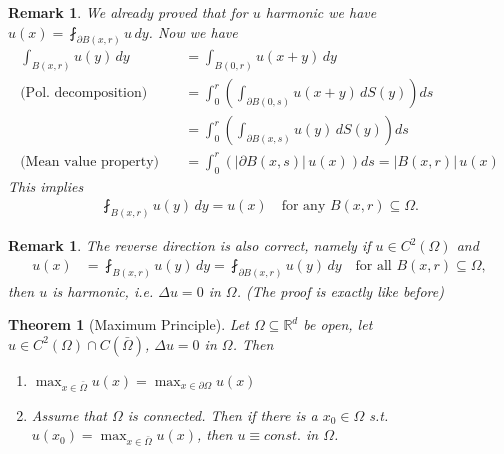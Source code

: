 \documentclass{report}
\theoremstyle{tommy}
\newtheorem{thm}[defn]{Theorem}
\newtheorem{rem}[defn]{Remark}
\begin{document}
  \begin{rem}
    We already proved that for \(u\) harmonic we have \( u(x) = \fint_{\partial B(x,r)} u \, dy \). Now we have 
    \begin{align*}
      \int_{B(x, r)} u(y) \, dy 
      &= \int_{B(0, r)} u(x+y) \, dy \\
      \text{(Pol.\ decomposition)} \quad &= \int_0^r \left(\int_{\partial B(0, s)} u(x+y) \, dS(y)\right) ds \\
      &= \int_0^r \left(\int_{\partial B(x, s)} u(y) \, dS(y) \right) ds \\
      \text{(Mean value property)} \quad &= \int_0^r \left(|\partial B(x, s)| \, u(x) \right) ds
      = |B(x,r)| \, u(x)
    \end{align*}
    This implies
    \begin{align*}
      \fint_{B(x,r)} u(y) \, dy = u(x)
      \quad \text{for any \(B(x,r) \subseteq \Omega\).}
    \end{align*}
  \end{rem}

  \begin{rem}
    The reverse direction is also correct, namely if \(u \in C^2(\Omega)\) and
    \begin{align*}
      u(x) 
      &= \fint_{B(x, r)} u(y) \, dy
      = \fint_{\partial B(x,r)} u(y) \, dy
      \quad \text{for all } B(x,r) \subseteq \Omega,
    \end{align*}
    then \(u\) is harmonic, i.e. \(\Delta u = 0\) in \(\Omega\). (The proof is exactly like before)
  \end{rem}

  \begin{thm}[Maximum Principle]\label{maximum-principle}
    Let \(\Omega \subseteq \mathbb{R}^d\) be open, let \(u \in C^2(\Omega) \cap C(\bar \Omega)\), \(\Delta u = 0\) in \(\Omega\). Then
    \begin{enumerate}[label=\alph*)]
      \item \(\max_{x \in \bar \Omega} u(x) = \max_{x \in \partial \Omega} u(x)\)
      \item Assume that \(\Omega\) is connected. Then if there is a \(x_0 \in \Omega\) s.t. \( u(x_0) = \max_{x \in \bar \Omega} u(x)\), then \( u \equiv const.\) in \(\Omega\).
    \end{enumerate}
  \end{thm}
\end{document}
